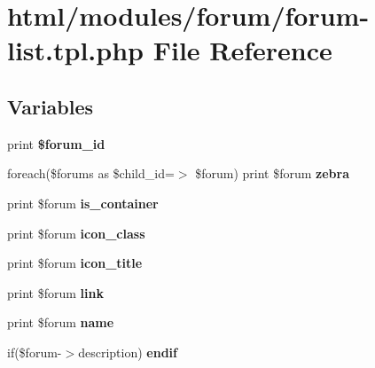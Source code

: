 \hypertarget{forum-list_8tpl_8php}{
\section{html/modules/forum/forum-\/list.tpl.php File Reference}
\label{forum-list_8tpl_8php}
}
\subsection*{Variables}
\begin{DoxyCompactItemize}
\item 
\hypertarget{forum-list_8tpl_8php_a34d61fc74c18838e5ac968032b90a3f9}{
print {\bfseries \$forum\_\-id}}
\label{forum-list_8tpl_8php_a34d61fc74c18838e5ac968032b90a3f9}

\item 
\hypertarget{forum-list_8tpl_8php_ab2afb0fd737f1a3161b83c05aa9bf0e9}{
foreach(\$forums as \$child\_\-id=$>$ \$forum) print \$forum {\bfseries zebra}}
\label{forum-list_8tpl_8php_ab2afb0fd737f1a3161b83c05aa9bf0e9}

\item 
\hypertarget{forum-list_8tpl_8php_aefd4ad989e095c4fd5a6ffbb6c53984d}{
print \$forum {\bfseries is\_\-container}}
\label{forum-list_8tpl_8php_aefd4ad989e095c4fd5a6ffbb6c53984d}

\item 
\hypertarget{forum-list_8tpl_8php_ab929fd3b80ff41d6a5d981d12ee7c3a0}{
print \$forum {\bfseries icon\_\-class}}
\label{forum-list_8tpl_8php_ab929fd3b80ff41d6a5d981d12ee7c3a0}

\item 
\hypertarget{forum-list_8tpl_8php_a4b2b933dfcfa4f41cb0c1d1911ade3a9}{
print \$forum {\bfseries icon\_\-title}}
\label{forum-list_8tpl_8php_a4b2b933dfcfa4f41cb0c1d1911ade3a9}

\item 
\hypertarget{forum-list_8tpl_8php_a96c4cb1b65109bc8e69e4fd558b76b54}{
print \$forum {\bfseries link}}
\label{forum-list_8tpl_8php_a96c4cb1b65109bc8e69e4fd558b76b54}

\item 
\hypertarget{forum-list_8tpl_8php_af45eed1e6416d36a59afb38dfbaed0f0}{
print \$forum {\bfseries name}}
\label{forum-list_8tpl_8php_af45eed1e6416d36a59afb38dfbaed0f0}

\item 
\hypertarget{forum-list_8tpl_8php_afb799dd9a092a5f9976f8b41dc0bcd98}{
if(\$forum-\/$>$description) {\bfseries endif}}
\label{forum-list_8tpl_8php_afb799dd9a092a5f9976f8b41dc0bcd98}


\end{DoxyCompactItemize}
